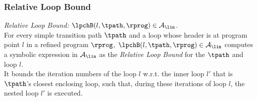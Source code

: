 \subsubsection{Relative Loop Bound}
\label{sec:}
%
\emph{Relative Loop Bound:} 
$\lpchB(l, \tpath, \rprog) \in \mathcal{A}_{\lin}$.
\\
For every simple transition path $\tpath$
and a loop whose header is at program point $l$ in a refined program $\rprog$,
 $\lpchB(l, \tpath, \rprog) \in \mathcal{A}_{\lin}$ computes a symbolic expression in $\mathcal{A}_{\lin}$
as the \emph{Relative Loop Bound} for the $\tpath$ and loop $l$.
\\
It bounds the iteration numbers of the loop $l$ w.r.t.
the inner loop $l'$ that is $\tpath$'s closest enclosing loop,
such that,
during these iterations of loop $l$, the nested loop $l'$ is executed.
